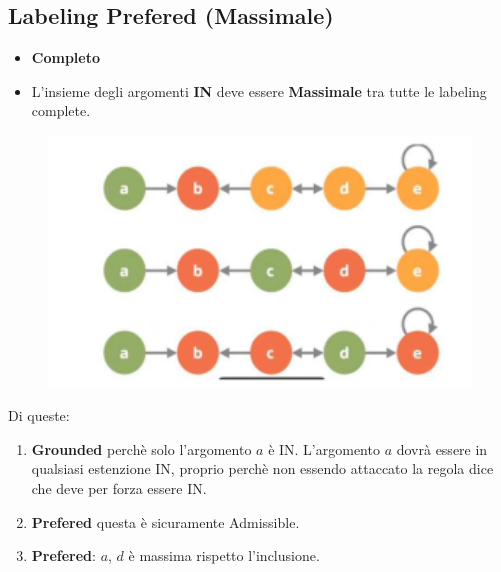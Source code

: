 \subsection{Labeling Prefered (Massimale)}
\begin{itemize}
    \item \textbf{Completo}
    \item L’insieme degli argomenti \textbf{IN} deve essere \textbf{Massimale} tra tutte le labeling complete.
\end{itemize}
\begin{figure}[htp]
	\centering
    \includegraphics[width=12cm, keepaspectratio]{img/Cap7/GR.png}
\end{figure}
Di queste:
\begin{enumerate}
    \item \textbf{Grounded} perchè solo l’argomento $a$ è IN. L’argomento $a$ dovrà essere in qualsiasi estenzione IN, proprio perchè non essendo attaccato la regola dice che deve per forza essere IN.
    \item \textbf{Prefered} questa è sicuramente Admissible.
    \item \textbf{Prefered}: $a$, $d$ è massima rispetto l’inclusione.
\end{enumerate}


